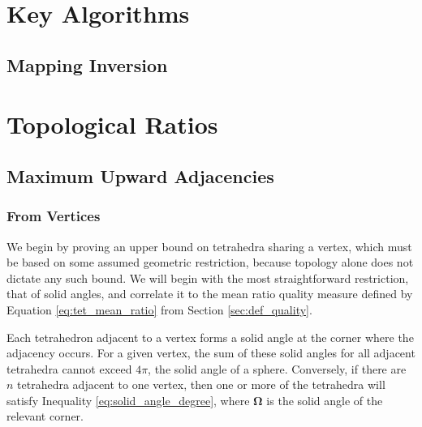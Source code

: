 
\appendix    %

\chapter{Key Algorithms}

\section{Mapping Inversion}
\label{sec:invert_map}

\chapter{Topological Ratios}

\section{Maximum Upward Adjacencies}

\subsection{From Vertices}
\label{app:vert_up_deg}

We begin by proving an upper bound on tetrahedra sharing a vertex,
which must be based on some assumed geometric restriction,
because topology alone does not dictate any such bound.
We will begin with the most straightforward restriction, that
of solid angles, and correlate it to the mean ratio quality measure
defined by Equation \ref{eq:tet_mean_ratio} from Section \ref{sec:def_quality}.

Each tetrahedron adjacent to a vertex forms a solid angle at
the corner where the adjacency occurs.
For a given vertex, the sum of these solid angles for all
adjacent tetrahedra cannot exceed $4\pi$, the solid angle of a sphere.
Conversely, if there are $n$ tetrahedra adjacent to one vertex,
then one or more of the tetrahedra will satisfy Inequality
\ref{eq:solid_angle_degree}, where $\mathbf{\Omega}$ is the
solid angle of the relevant corner.

